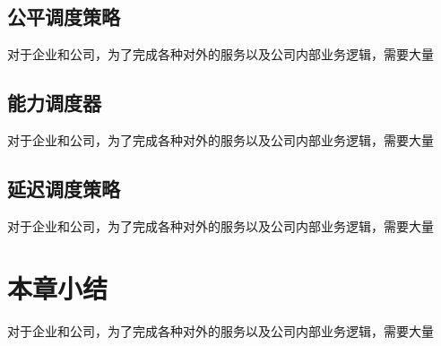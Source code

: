 \subsection{公平调度策略}
对于企业和公司，为了完成各种对外的服务以及公司内部业务逻辑，需要大量
\subsection{能力调度器}
对于企业和公司，为了完成各种对外的服务以及公司内部业务逻辑，需要大量
\subsection{延迟调度策略}
对于企业和公司，为了完成各种对外的服务以及公司内部业务逻辑，需要大量

\section{本章小结}

对于企业和公司，为了完成各种对外的服务以及公司内部业务逻辑，需要大量
